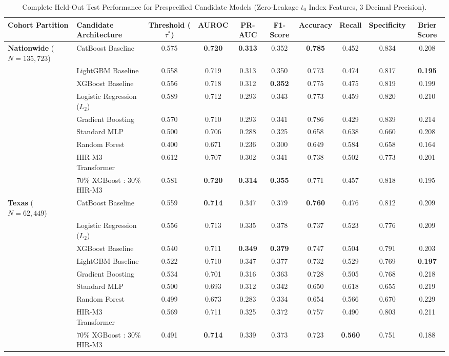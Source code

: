\documentclass[10pt,journal]{IEEEtran}
\begin{document}
\begin{table}[!t]
\caption{Complete Held-Out Test Performance for Prespecified Candidate Models (Zero-Leakage $t_0$ Index Features, 3 Decimal Precision).}
\label{tab:s_all_model_performance}
\centering
\footnotesize
\begin{tabular}{llcccccccc}
\toprule
\textbf{Cohort Partition} & \textbf{Candidate Architecture} & \textbf{Threshold ($\tau^*$)} & \textbf{AUROC} & \textbf{PR-AUC} & \textbf{F1-Score} & \textbf{Accuracy} & \textbf{Recall} & \textbf{Specificity} & \textbf{Brier Score} \\
\midrule
\textbf{Nationwide} ($N=135,723$) & CatBoost Baseline & 0.575 & \textbf{0.720} & \textbf{0.313} & 0.352 & \textbf{0.785} & 0.452 & 0.834 & 0.208 \\
 & LightGBM Baseline & 0.558 & 0.719 & 0.313 & 0.350 & 0.773 & 0.474 & 0.817 & \textbf{0.195} \\
 & XGBoost Baseline & 0.556 & 0.718 & 0.312 & \textbf{0.352} & 0.775 & 0.475 & 0.819 & 0.199 \\
 & Logistic Regression ($L_2$) & 0.589 & 0.712 & 0.293 & 0.343 & 0.773 & 0.459 & 0.820 & 0.210 \\
 & Gradient Boosting & 0.570 & 0.710 & 0.293 & 0.341 & 0.786 & 0.429 & 0.839 & 0.214 \\
 & Standard MLP & 0.500 & 0.706 & 0.288 & 0.325 & 0.658 & 0.638 & 0.660 & 0.208 \\
 & Random Forest & 0.400 & 0.671 & 0.236 & 0.300 & 0.649 & 0.584 & 0.658 & 0.164 \\
 & HIR-M3 Transformer & 0.612 & 0.707 & 0.302 & 0.341 & 0.738 & 0.502 & 0.773 & 0.201 \\
 & 70\% XGBoost : 30\% HIR-M3 & 0.581 & \textbf{0.720} & \textbf{0.314} & \textbf{0.355} & 0.771 & 0.457 & 0.818 & 0.195 \\
\midrule
\textbf{Texas} ($N=62,449$) & CatBoost Baseline & 0.559 & \textbf{0.714} & 0.347 & 0.379 & \textbf{0.760} & 0.476 & 0.812 & 0.209 \\
 & Logistic Regression ($L_2$) & 0.556 & 0.713 & 0.335 & 0.378 & 0.737 & 0.523 & 0.776 & 0.209 \\
 & XGBoost Baseline & 0.540 & 0.711 & \textbf{0.349} & \textbf{0.379} & 0.747 & 0.504 & 0.791 & 0.203 \\
 & LightGBM Baseline & 0.522 & 0.710 & 0.347 & 0.377 & 0.732 & 0.529 & 0.769 & \textbf{0.197} \\
 & Gradient Boosting & 0.534 & 0.701 & 0.316 & 0.363 & 0.728 & 0.505 & 0.768 & 0.218 \\
 & Standard MLP & 0.500 & 0.693 & 0.312 & 0.342 & 0.650 & 0.618 & 0.655 & 0.219 \\
 & Random Forest & 0.499 & 0.673 & 0.283 & 0.334 & 0.654 & 0.566 & 0.670 & 0.229 \\
 & HIR-M3 Transformer & 0.569 & 0.711 & 0.325 & 0.372 & 0.757 & 0.490 & 0.803 & 0.211 \\
 & 70\% XGBoost : 30\% HIR-M3 & 0.491 & \textbf{0.714} & 0.339 & 0.373 & 0.723 & \textbf{0.560} & 0.751 & 0.188 \\
\bottomrule
\end{tabular}
\end{table}
\end{document}
